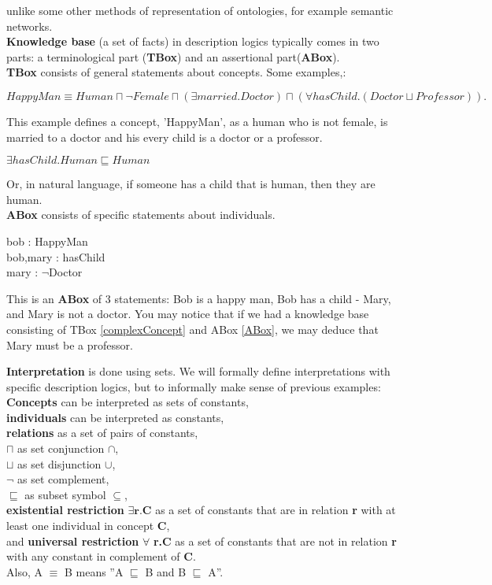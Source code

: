unlike some other methods of representation of ontologies, for example semantic networks. 
\\ \textbf{Knowledge base} (a set of facts) in description logics typically comes in two parts: a terminological part (\textbf{TBox}) and an assertional part(\textbf{ABox}).\\
\textbf{TBox} consists of general statements about concepts. Some examples,: 
\begin{myex}
\label{complexConcept}
 \cite{handbook2} 
$HappyMan  \equiv   Human  \sqcap  \neg  Female  \sqcap  (\exists  married.Doctor) \sqcap
(\forall  hasChild.(Doctor  \sqcup  Professor)).$
\end{myex}
This example defines a concept, 'HappyMan',  as a human who is not female, is married to a doctor and his every child is a doctor or a professor.
\begin{myex} \cite{handbook2}
$\exists hasChild.Human \sqsubseteq Human$
\end{myex}
Or, in natural language, if someone has a child that is human, then they are human. \\
\textbf{ABox} consists of specific statements about individuals. 
\begin{myex} 
\label{ABox}
\cite{handbook2}
bob : HappyMan \\
bob,mary : hasChild\\
mary : $\neg$Doctor
\end{myex}
This is an \textbf{ABox} of 3 statements: Bob is a happy man, Bob has a child - Mary, and Mary is not a doctor.
You may notice that if we had a knowledge base consisting of TBox \ref{complexConcept} and ABox \ref{ABox}, we may deduce  that Mary must be a professor.

\textbf{Interpretation} is done using sets. We will formally define interpretations with specific description logics, but to informally make sense of previous examples: \\
\textbf{Concepts} can be interpreted as sets of constants,\\ \textbf{individuals} can be interpreted as constants,\\ \textbf{relations} as a set of pairs of constants,\\ \textbf{$\sqcap$} as set conjunction $\cap$, \\ \textbf{$\sqcup$} as set disjunction $\cup$,\\ $\neg$ as set complement,\\ $\sqsubseteq$ as subset symbol $\subseteq$,\\ \textbf{existential restriction} $\exists \textbf{r.C}$ as a set of constants that are in relation \textbf{r} with at least one individual in concept \textbf{C},\\ and \textbf{universal restriction} $\forall$ \textbf{r.C} as a set of constants that are not in relation \textbf{r} with any constant in complement of \textbf{C}. \\Also, A $\equiv$ B means ''A $\sqsubseteq$ B and B $\sqsubseteq$ A''.  

